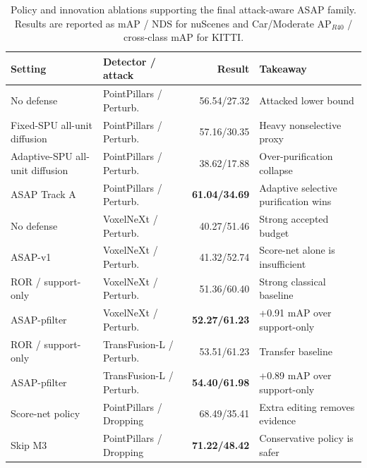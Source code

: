 \begin{table}[t]
\centering
\scriptsize
\setlength{\tabcolsep}{3.5pt}
\caption{Policy and innovation ablations supporting the final attack-aware ASAP family. Results are reported as mAP / NDS for nuScenes and Car/Moderate AP$_{R40}$ / cross-class mAP for KITTI.}
\label{tab:policy_ablations}
\begin{tabular}{llrl}
\toprule
Setting & Detector / attack & Result & Takeaway \\
\midrule
No defense & PointPillars / Perturb. & 56.54/27.32 & Attacked lower bound \\
Fixed-SPU all-unit diffusion & PointPillars / Perturb. & 57.16/30.35 & Heavy nonselective proxy \\
Adaptive-SPU all-unit diffusion & PointPillars / Perturb. & 38.62/17.88 & Over-purification collapse \\
ASAP Track A & PointPillars / Perturb. & \textbf{61.04/34.69} & Adaptive selective purification wins \\
No defense & VoxelNeXt / Perturb. & 40.27/51.46 & Strong accepted budget \\
ASAP-v1 & VoxelNeXt / Perturb. & 41.32/52.74 & Score-net alone is insufficient \\
ROR / support-only & VoxelNeXt / Perturb. & 51.36/60.40 & Strong classical baseline \\
ASAP-pfilter & VoxelNeXt / Perturb. & \textbf{52.27/61.23} & +0.91 mAP over support-only \\
ROR / support-only & TransFusion-L / Perturb. & 53.51/61.23 & Transfer baseline \\
ASAP-pfilter & TransFusion-L / Perturb. & \textbf{54.40/61.98} & +0.89 mAP over support-only \\
Score-net policy & PointPillars / Dropping & 68.49/35.41 & Extra editing removes evidence \\
Skip M3 & PointPillars / Dropping & \textbf{71.22/48.42} & Conservative policy is safer \\
\bottomrule
\end{tabular}
\end{table}

